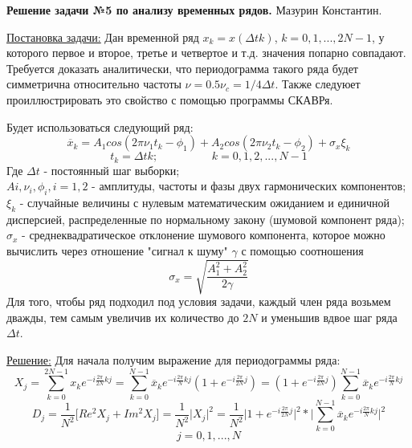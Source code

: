 \documentclass[a4paper,12pt]{report}
\begin{document}
\begin{center}
\Large
{\bf Решение задачи №5 по анализу временных рядов.} 
{ Мазурин Константин.}
\end{center}

\underline{Постановка задачи:} Дан временной ряд $x_k = x({\Delta}tk)$, $k = 0,1,...,2N - 1$, у которого первое и второе, третье и четвертое и т.д. значения
попарно совпадают. Требуется доказать аналитически, что периодограмма такого ряда будет симметрична относительно частоты $\nu = 0.5\nu_c = 1/4{\Delta}t$.
Также следуюет проиллюстрировать это свойство с помощью программы СКАВРя.

Будет использоваться следующий ряд:
\begin{equation}
\overline{x}_k = A_{1}cos(2\pi\nu_{1}t_k - \phi_1) + A_{2}cos(2\pi\nu_{2}t_k - \phi_2) + \sigma_{x}\xi_k 
\end{equation}
\begin{equation}
t_k = {\Delta}t k; \hspace{2cm} k = 0,1,2,...,N-1
\end{equation}
Где ${\Delta}t$ - постоянный шаг выборки;
\\ $Ai, \nu_i, \phi_i, i = 1,2$ - амплитуды, частоты и фазы двух гармонических компонентов;
\\ $\xi_k$ - случайные величины с нулевым математическим ожиданием и единичной дисперсией, распределенные по нормальному закону (шумовой компонент ряда);
\\ $\sigma_x$ - среднеквадратическое отклонение шумового компонента, которое можно вычислить через отношение "сигнал к шуму" $\gamma$ с помощью соотношения
\begin{equation}
\sigma_x = \sqrt{\frac{A_{1}^2 + A_{2}^2}{2\gamma}}
\end{equation}
Для того, чтобы ряд подходил под условия задачи, каждый член ряда возьмем дважды, тем самым увеличив их количество до $2N$ и уменьшив вдвое шаг ряда ${\Delta}t$.

\vspace{1cm}
\underline{Решение:}
Для начала получим выражение для периодограммы ряда:
\begin{equation}
X_j = \sum\limits_{k=0}^{2N-1} x_{k}e^{-i\frac{2\pi}{2N}kj} = \sum\limits_{k=0}^{N-1} \overline{x}_{k}e^{-i\frac{2\pi}{N}kj} (1 + e^{-i\frac{2\pi}{2N}j}) 
= (1 + e^{-i\frac{2\pi}{2N}j}) \sum\limits_{k=0}^{N-1} \overline{x}_{k}e^{-i\frac{2\pi}{N}kj}
\end{equation}
\begin{equation}
D_j = \frac{1}{N^2} \lbrack Re^{2}X_j + Im^{2}X_j \rbrack = \frac{1}{N^2} \vert X_j \vert^2 = \frac{1}{N^2} \big\vert 1 + e^{-i\frac{2\pi}{2N}j} \big\vert^2 *
\Big\vert \sum\limits_{k=0}^{N-1} \overline{x}_{k}e^{-i\frac{2\pi}{N}kj} \Big\vert^2
\end{equation}
\begin{equation}
j = 0,1,...,N
\end{equation}
\end{document}

